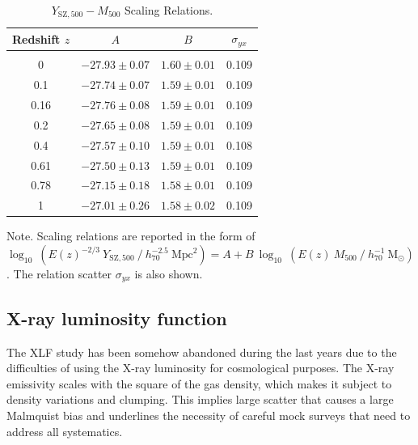 \documentclass[traditabstract]{aa}
\newcommand{\rmn}{\mathrm}
\begin{document}
\begin{table}[t]
\begin{center}
\caption{$Y_{\rmn{SZ}, 500}-M_{500}$ Scaling Relations.}
\medskip
\begin{tabular}{cccc}
\hline
\phantom{\Big|}
Redshift $z$ & $A$ & $B$ & $\sigma_{yx}$ \\
\hline\\[-0.5em]
 0      & $-27.93\pm0.07$ & $1.60\pm0.01$ & 0.109\\
 0.1   & $-27.74\pm0.07$ & $1.59\pm0.01$ & 0.109\\
 0.16 & $-27.76\pm0.08$ & $1.59\pm0.01$ & 0.109\\
 0.2   & $-27.65\pm0.08$ & $1.59\pm0.01$ & 0.109\\ 
 0.4   & $-27.57\pm0.10$ & $1.59\pm0.01$ & 0.108\\ 
 0.61 & $-27.50\pm0.13$ & $1.59\pm0.01$ & 0.109\\ 
 0.78 & $-27.15\pm0.18$ & $1.58\pm0.01$ & 0.109\\ 
 1      & $-27.01\pm0.26$ & $1.58\pm0.02$ & 0.109\\[0.5em] 
\hline
\end{tabular}
\label{tab:YSZfits}
\end{center}
\footnotesize{Note. Scaling relations are reported in the form of $\log_{10}~(E(z)^{-2/3}~Y_{\rmn{SZ},500}~/~h_{70}^{-2.5}~\rmn{Mpc}^{2})=A+B~\log_{10}~(E(z)~M_{500}~/~h_{70}^{-1}~\rmn{M_{\odot}})$. The relation scatter $\sigma_{yx}$ is also shown.}
\end{table}



\subsection{X-ray luminosity function}

The XLF study has been somehow abandoned during the last years due to the
difficulties of using the X-ray luminosity for cosmological purposes. The X-ray
emissivity scales with the square of the gas density, which makes it subject to
density variations and clumping. This implies large scatter that causes a large
Malmquist bias and underlines the necessity of careful mock surveys that need to
address all systematics.
\end{document}
